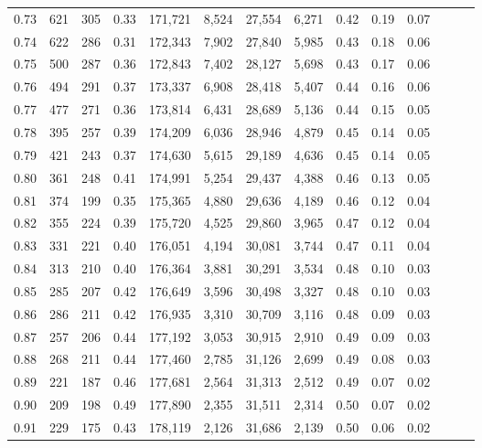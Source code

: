 \begin{tabular}{rrrrrrrrrrrrrr}
0.73 &    621 &  305 &  0.33 &  171,721 &    8,524 &  27,554 &   6,271 &  0.42 &  0.19 &      0.07 \\
0.74 &    622 &  286 &  0.31 &  172,343 &    7,902 &  27,840 &   5,985 &  0.43 &  0.18 &      0.06 \\
0.75 &    500 &  287 &  0.36 &  172,843 &    7,402 &  28,127 &   5,698 &  0.43 &  0.17 &      0.06 \\
0.76 &    494 &  291 &  0.37 &  173,337 &    6,908 &  28,418 &   5,407 &  0.44 &  0.16 &      0.06 \\
0.77 &    477 &  271 &  0.36 &  173,814 &    6,431 &  28,689 &   5,136 &  0.44 &  0.15 &      0.05 \\
0.78 &    395 &  257 &  0.39 &  174,209 &    6,036 &  28,946 &   4,879 &  0.45 &  0.14 &      0.05 \\
0.79 &    421 &  243 &  0.37 &  174,630 &    5,615 &  29,189 &   4,636 &  0.45 &  0.14 &      0.05 \\
0.80 &    361 &  248 &  0.41 &  174,991 &    5,254 &  29,437 &   4,388 &  0.46 &  0.13 &      0.05 \\
0.81 &    374 &  199 &  0.35 &  175,365 &    4,880 &  29,636 &   4,189 &  0.46 &  0.12 &      0.04 \\
0.82 &    355 &  224 &  0.39 &  175,720 &    4,525 &  29,860 &   3,965 &  0.47 &  0.12 &      0.04 \\
0.83 &    331 &  221 &  0.40 &  176,051 &    4,194 &  30,081 &   3,744 &  0.47 &  0.11 &      0.04 \\
0.84 &    313 &  210 &  0.40 &  176,364 &    3,881 &  30,291 &   3,534 &  0.48 &  0.10 &      0.03 \\
0.85 &    285 &  207 &  0.42 &  176,649 &    3,596 &  30,498 &   3,327 &  0.48 &  0.10 &      0.03 \\
0.86 &    286 &  211 &  0.42 &  176,935 &    3,310 &  30,709 &   3,116 &  0.48 &  0.09 &      0.03 \\
0.87 &    257 &  206 &  0.44 &  177,192 &    3,053 &  30,915 &   2,910 &  0.49 &  0.09 &      0.03 \\
0.88 &    268 &  211 &  0.44 &  177,460 &    2,785 &  31,126 &   2,699 &  0.49 &  0.08 &      0.03 \\
0.89 &    221 &  187 &  0.46 &  177,681 &    2,564 &  31,313 &   2,512 &  0.49 &  0.07 &      0.02 \\
0.90 &    209 &  198 &  0.49 &  177,890 &    2,355 &  31,511 &   2,314 &  0.50 &  0.07 &      0.02 \\
0.91 &    229 &  175 &  0.43 &  178,119 &    2,126 &  31,686 &   2,139 &  0.50 &  0.06 &      0.02 \\

\end{tabular}
